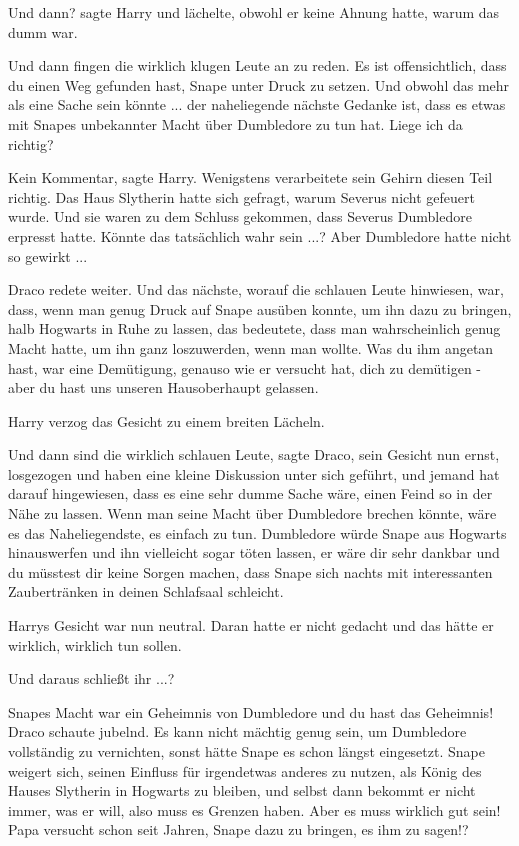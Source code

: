 \glqq{}Und dann?\grqq{} sagte Harry und lächelte, obwohl er keine Ahnung hatte,
warum das dumm war.

\glqq{}Und dann fingen die wirklich klugen Leute an zu reden. Es ist
offensichtlich, dass du einen Weg gefunden hast, Snape unter Druck zu setzen.
Und obwohl das mehr als eine Sache sein könnte ... der naheliegende nächste
Gedanke ist, dass es etwas mit Snapes unbekannter Macht über Dumbledore zu tun
hat. Liege ich da richtig?\grqq{}

\glqq{}Kein Kommentar\grqq{}, sagte Harry. Wenigstens verarbeitete sein Gehirn
diesen Teil richtig. Das Haus Slytherin hatte sich gefragt, warum Severus nicht
gefeuert wurde. Und sie waren zu dem Schluss gekommen, dass Severus Dumbledore
erpresst hatte. Könnte das tatsächlich wahr sein ...? Aber Dumbledore hatte nicht
so gewirkt ...

Draco redete weiter. \glqq{}Und das nächste, worauf die schlauen Leute hinwiesen,
war, dass, wenn man genug Druck auf Snape ausüben konnte, um ihn dazu zu
bringen, halb Hogwarts in Ruhe zu lassen, das bedeutete, dass man wahrscheinlich
genug Macht hatte, um ihn ganz loszuwerden, wenn man wollte. Was du ihm angetan
hast, war eine Demütigung, genauso wie er versucht hat, dich zu demütigen - aber
du hast uns unseren Hausoberhaupt gelassen.\grqq{}

Harry verzog das Gesicht zu einem breiten Lächeln.

\glqq{}Und dann sind die wirklich schlauen Leute\grqq{}, sagte Draco, sein
Gesicht nun ernst, \glqq{}losgezogen und haben eine kleine Diskussion unter sich
geführt, und jemand hat darauf hingewiesen, dass es eine sehr dumme Sache wäre,
einen Feind so in der Nähe zu lassen. Wenn man seine Macht über Dumbledore
brechen könnte, wäre es das Naheliegendste, es einfach zu tun. Dumbledore würde
Snape aus Hogwarts hinauswerfen und ihn vielleicht sogar töten lassen, er wäre
dir sehr dankbar und du müsstest dir keine Sorgen machen, dass Snape sich nachts
mit interessanten Zaubertränken in deinen Schlafsaal schleicht.\grqq{}

Harrys Gesicht war nun neutral. Daran hatte er nicht gedacht und das hätte er
wirklich, wirklich tun sollen.

\glqq{}Und daraus schließt ihr ...?\grqq{}

\glqq{}Snapes Macht war ein Geheimnis von Dumbledore und du hast das
Geheimnis!\grqq{} Draco schaute jubelnd. \glqq{}Es kann nicht mächtig genug sein,
um Dumbledore vollständig zu vernichten, sonst hätte Snape es schon längst
eingesetzt. Snape weigert sich, seinen Einfluss für irgendetwas anderes zu
nutzen, als König des Hauses Slytherin in Hogwarts zu bleiben, und selbst dann
bekommt er nicht immer, was er will, also muss es Grenzen haben. Aber es muss
wirklich gut sein! Papa versucht schon seit Jahren, Snape dazu zu bringen, es
ihm zu sagen!?\grqq{}

